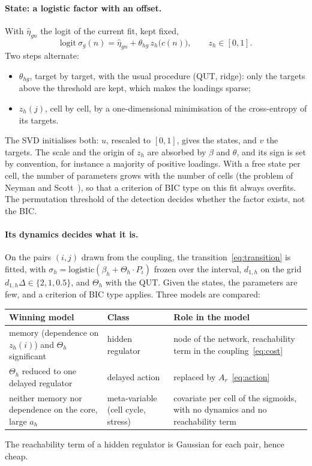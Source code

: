 \documentclass[a4paper, 11pt]{article}
\theoremstyle{plain}
\theoremstyle{remark}
\begin{document}
\paragraph{State: a logistic factor with an offset.} With $\hat\eta_{gn}$ the logit of the current fit, kept fixed,
\[
\mathrm{logit}\ \sigma_g(n) = \hat\eta_{gn} + \theta_{hg}\, z_h\big(c(n)\big), \qquad z_h \in [0,1].
\]
Two steps alternate:
\begin{itemize}[nosep]
\item $\theta_{hg}$, target by target, with the usual procedure (QUT, ridge): only the targets above the threshold are kept, which makes the loadings sparse;
\item $z_h(j)$, cell by cell, by a one-dimensional minimisation of the cross-entropy of its targets.
\end{itemize}
The SVD initialises both: $u$, rescaled to $[0,1]$, gives the states, and $v$ the targets. The scale and the origin of $z_h$ are absorbed by $\beta$ and $\theta$, and its sign is set by convention, for instance a majority of positive loadings. With a free state per cell, the number of parameters grows with the number of cells (the problem of Neyman and Scott~\cite{neyman1948consistent}), so that a criterion of BIC type on this fit always overfits. The permutation threshold of the detection decides whether the factor exists, not the BIC.

\paragraph{Its dynamics decides what it is.} On the pairs $(i, j)$ drawn from the coupling, the transition~\eqref{eq:transition} is fitted, with $\sigma_h = \mathrm{logistic}(\beta_h + \Theta_h \cdot P_i)$ frozen over the interval, $d_{1,h}$ on the grid $d_{1,h}\Delta \in \{2, 1, 0.5\}$, and $\Theta_h$ with the QUT. Given the states, the parameters are few, and a criterion of BIC type applies. Three models are compared:
\begin{center}
\begin{tabular}{@{}p{}p{}p{}@{}}
\toprule
Winning model & Class & Role in the model \\
\midrule
memory (dependence on $z_h(i)$) and $\Theta_h$ significant & hidden regulator & node of the network, reachability term in the coupling~\eqref{eq:cost} \\
$\Theta_h$ reduced to one delayed regulator & delayed action & replaced by $A_r$~\eqref{eq:action} \\
neither memory nor dependence on the core, large $a_h$ & meta-variable (cell cycle, stress) & covariate per cell of the sigmoids, with no dynamics and no reachability term \\
\bottomrule
\end{tabular}
\end{center}
The reachability term of a hidden regulator is Gaussian for each pair, hence cheap.
\end{document}
